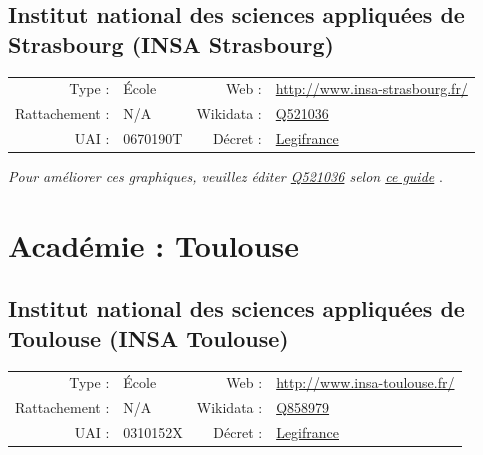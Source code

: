 \documentclass[11pt,french,landscape]{article}
\begin{document}
\hypertarget{institut-national-des-sciences-appliquuxe9es-de-strasbourg-insa-strasbourg}{%
\subsection{Institut national des sciences appliquées de Strasbourg
(INSA
Strasbourg)}\label{institut-national-des-sciences-appliquuxe9es-de-strasbourg-insa-strasbourg}}

\begin{tabular*}{0.45\textwidth}{rp{2cm}rl}  
\hline  
Type : & École & Web : &\href{http://www.insa-strasbourg.fr/}{http://www.insa-strasbourg.fr/} \\  
Rattachement : & N/A & Wikidata : & \href{https://www.wikidata.org/entity/Q521036}{Q521036} \\  
UAI : & 0670190T & Décret : & \href{Abrogé}{Legifrance} \\  
\hline  
\end{tabular*}

\textit{\scriptsize Pour améliorer ces graphiques, veuillez éditer \href{https://www.wikidata.org/entity/Q521036}{Q521036}  selon \href{https://github.com/cpesr/wikidataESR/blob/master/Rmd/wikidataESR.md}{ce guide}}
.


\newpage

\hypertarget{acaduxe9mie-toulouse-1}{%
\section{Académie : Toulouse}\label{acaduxe9mie-toulouse-1}}

\hypertarget{institut-national-des-sciences-appliquuxe9es-de-toulouse-insa-toulouse}{%
\subsection{Institut national des sciences appliquées de Toulouse (INSA
Toulouse)}\label{institut-national-des-sciences-appliquuxe9es-de-toulouse-insa-toulouse}}

\begin{tabular*}{0.45\textwidth}{rp{2cm}rl}  
\hline  
Type : & École & Web : &\href{http://www.insa-toulouse.fr/}{http://www.insa-toulouse.fr/} \\  
Rattachement : & N/A & Wikidata : & \href{https://www.wikidata.org/entity/Q858979}{Q858979} \\  
UAI : & 0310152X & Décret : & \href{Abrogé}{Legifrance} \\  
\hline  
\end{tabular*}
\end{document}
